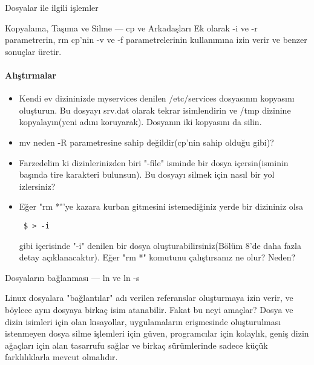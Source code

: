 \documentclass[10pt,a5paper]{book}
\begin{document}
\begin{section}{Dosyalar ile ilgili işlemler}
\begin{subsection}{Kopyalama, Taşıma ve Silme — cp ve Arkadaşları}
Ek olarak -i ve -r parametrerin, rm cp'nin -v ve -f parametrelerinin kullanımına izin verir ve benzer sonuçlar üretir.

\paragraph{Alıştırmalar}{
\begin{itemize}
 \item Kendi ev dizininizde myservices denilen /etc/services dosyasının kopyasını oluşturun. Bu dosyayı srv.dat olarak tekrar isimlendirin ve /tmp dizinine kopyalayın(yeni adını koruyarak). Dosyanın iki kopyasını da silin.
 \item mv neden -R parametresine sahip değildir(cp'nin sahip olduğu gibi)?
 \item Farzedelim ki dizinlerinizden biri "-file" isminde bir dosya içersin(isminin başında tire karakteri bulunsun). Bu dosyayı silmek için nasıl bir yol izlersiniz?
 \item Eğer "rm *"'ye kazara kurban gitmesini istemediğiniz yerde bir dizininiz olsa \begin{verbatim}
 $ > -i
 \end{verbatim}gibi içerisinde "-i" denilen bir dosya oluşturabilirsiniz(Bölüm 8'de daha fazla detay açıklanacaktır). Eğer "rm *" komutunu çalıştırsanız ne olur? Neden?
\end{itemize}}
\end{subsection}
\begin{subsection}{Dosyaların bağlanması — ln ve ln -s}

Linux dosyalara "bağlantılar" adı verilen referanslar oluşturmaya izin verir, ve böylece aynı dosyaya birkaç isim atanabilir. Fakat bu neyi amaçlar? Dosya ve dizin isimleri için olan kısayollar, uygulamaların erişmesinde oluşturulması istenmeyen dosya silme işlemleri için güven, programcılar için kolaylık, geniş dizin ağaçları için alan tasarrufu sağlar ve birkaç sürümlerinde sadece küçük farklılıklarla mevcut olmalıdır.


\end{subsection}
\end{section}
\end{document}
